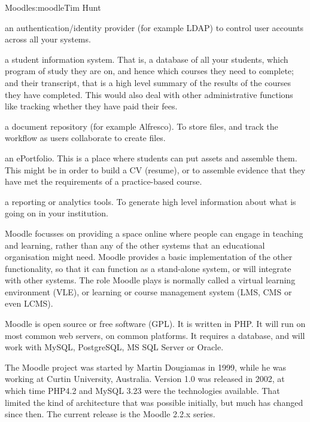 \begin{aosachapter}{Moodle}{s:moodle}{Tim Hunt}
\begin{aosaitemize}

\item an authentication/identity provider (for example LDAP) to
  control user accounts across all your systems.

\item a student information system. That is, a database of all your
  students, which program of study they are on, and hence which
  courses they need to complete; and their transcript, that is a high
  level summary of the results of the courses they have
  completed. This would also deal with other administrative functions
  like tracking whether they have paid their fees.

\item a document repository (for example Alfresco). To store files,
  and track the workflow as users collaborate to create files.

\item an ePortfolio. This is a place where students can put assets and
  assemble them. This might be in order to build a CV (resume), or to
  assemble evidence that they have met the requirements of a
  practice-based course.

\item a reporting or analytics tools. To generate high level
  information about what is going on in your institution.

\end{aosaitemize}

Moodle focusses on providing a space online where people can engage in
teaching and learning, rather than any of the other systems that an
educational organisation might need. Moodle provides a basic
implementation of the other functionality, so that it can function as
a stand-alone system, or will integrate with other systems. The role
Moodle plays is normally called a virtual learning environment (VLE),
or learning or course management system (LMS, CMS or even LCMS).

Moodle is open source or free software (GPL). It is written in PHP. It
will run on most common web servers, on common platforms. It requires
a database, and will work with MySQL, PostgreSQL, MS SQL Server or
Oracle.

The Moodle project was started by Martin Dougiamas in 1999, while he
was working at Curtin University, Australia. Version 1.0 was released
in 2002, at which time PHP4.2 and MySQL 3.23 were the technologies
available. That limited the kind of architecture that was possible
initially, but much has changed since then. The current release is the
Moodle 2.2.x series.


\end{aosachapter}
